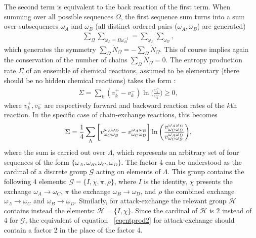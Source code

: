 \documentclass[
	amsmath,
	amssymb,
	a4paper,
	aip,		%
	jcp,		%
	reprint, twocolumn  %
	fleqn,
	showpacs,
	floatfix
]{revtex4-1}
\begin{document}
The second term is equivalent to the back reaction of the first term. When summing over all possible sequences $\Omega$, the first sequence sum 
turns into a sum over subsequences $\omega_{A}$ and $\omega_{B}$ (all distinct ordered pairs ($\omega_{A},\omega_{B}$) are generated)
\begin{equation}
	\begin{split}
\sum_{\Omega} \sum_{\omega_{A}=\Omega \omega_{B}^{-1}}=  \sum_{\omega_{A}} \sum_{\omega_{B}} ,
\end{split}
\label{sumtrans}
\end{equation}
which generates the symmetry $\sum_{\Omega} \dot{N}_{\Omega}= - \sum_{\Omega}\dot{N}_{\Omega}$. This of course implies again 
the conservation of the number 
of chains $\sum_{\Omega} \dot{N}_{\Omega} =0$. 
The entropy production rate $\Sigma$ of an ensemble of chemical reactions, 
assumed to be elementary (there should be no hidden chemical reactions) takes the form \citep{Kondepudi1998}:
\begin{equation}
	\begin{split}
\Sigma= \sum_{k} (v_{k}^{+}-v_{k}^{-}) \ln \bigg(\frac{v_{k}^{+}}{v_{k}^{-}} \bigg)\geq 0 ,
\end{split}
\label{eqentprod1}
\end{equation}
where $v_{k}^{+},v_{k}^{-}$ are respectively forward and backward reaction rates of the $k$th reaction. 
In the specific case of chain-exchange reactions, this becomes
\begin{equation}
\Sigma= \frac{1}{4}   \sum_\Lambda \bigg[ v^{\omega_{A} \omega_{D}}_{\omega_{C} \omega_{B}}   -  v^{\omega_{A} \omega_{B}}_{\omega_{C} \omega_{D}}  \bigg] \\ 
\ln \bigg(\frac{ v^{\omega_{A} \omega_{B}}_{\omega_{C} \omega_{D}} }{  v^{\omega_{A} \omega_{D}}_{\omega_{C} \omega_{B}} }\bigg),
\label{eqentprod2}
\end{equation}
where the sum is carried out over $\Lambda$, which represents an arbitrary set of four sequences 
of the form $\{ \omega_{A},\omega_{B},\omega_{C},\omega_{D} \}$.
The factor 4 can be understood as the cardinal of a discrete group $\mathcal{G}$ acting on elements of $\Lambda$. 
This group contains the following 4 elements: $\mathcal{G}= \{ I, \chi, \pi, \rho \}$, where $I$ is the identity, 
$\chi$ presents the exchange $\omega_{A} \rightarrow \omega_{C}$, $\pi$ the exchange $\omega_{B} \rightarrow \omega_{D}$, and
$\rho$ the combined exchange $\omega_{A} \rightarrow \omega_{C}$ and $\omega_{B} \rightarrow \omega_{D}$. 
Similarly, for attack-exchange the relevant group $\mathcal{H}$ contains instead the elements: 
$\mathcal{H}=\{I,\chi\}$. Since the cardinal of $\mathcal{H}$ is 2 instead of 4 for $\mathcal{G}$, 
the equivalent of equation ~\eqref{eqentprod2} for attack-exchange should contain 
a factor 2 in the place of the factor 4. 
\end{document}
